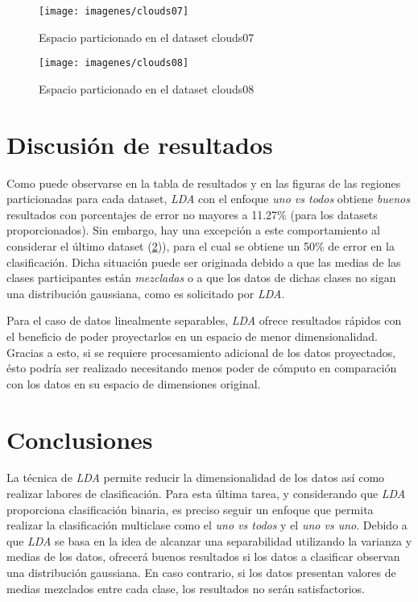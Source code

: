 \documentclass[journal]{IEEEtran}
\begin{document}
\begin{figure}[tb]
	\begin{center}
		\texttt{[image: imagenes/clouds07]}
	\end{center}
	\caption{Espacio particionado en el dataset clouds07}
	\label{fig:lda-dataset-07}
\end{figure}

\begin{figure}[tb]
	\begin{center}
		\texttt{[image: imagenes/clouds08]}
	\end{center}
	\caption{Espacio particionado en el dataset clouds08}
	\label{fig:lda-dataset-08}
\end{figure}

\section{Discusión de resultados}
\label{sec:discusion}
Como puede observarse en la tabla de resultados y en las figuras de las regiones particionadas para cada dataset, \emph{LDA} con el enfoque \emph{uno vs todos} obtiene \emph{buenos} resultados con porcentajes de error no mayores a 11.27\% (para los datasets proporcionados).
Sin embargo, hay una excepción a este comportamiento al considerar el último dataset (\ref{fig:lda-dataset-08})), para el cual se obtiene un 50\% de error en la clasificación.
Dicha situación puede ser originada debido a que las medias de las clases participantes están \emph{mezcladas} o a que los datos de dichas clases no sigan una distribución gaussiana, como es solicitado por \emph{LDA}.

Para el caso de datos linealmente separables, \emph{LDA} ofrece resultados rápidos con el beneficio de poder proyectarlos en un espacio de menor dimensionalidad.
Gracias a esto, si se requiere procesamiento adicional de los datos proyectados, ésto podría ser realizado necesitando menos poder de cómputo en comparación con los datos en su espacio de dimensiones original.

\section{Conclusiones}
\label{sec:conclusiones}
La técnica de \emph{LDA} permite reducir la dimensionalidad de los datos así como realizar labores de clasificación.
Para esta última tarea, y considerando que \emph{LDA} proporciona clasificación binaria, es preciso seguir un enfoque que permita realizar la clasificación multiclase como el \emph{uno vs todos} y el \emph{uno vs uno}.
Debido a que \emph{LDA} se basa en la idea de alcanzar una separabilidad utilizando la varianza y medias de los datos, ofrecerá buenos resultados si los datos a clasificar observan una distribución gaussiana.
En caso contrario, si los datos presentan valores de medias mezclados entre cada clase, los resultados no serán satisfactorios.
\end{document}
